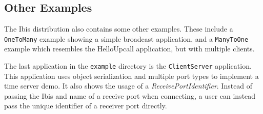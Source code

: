 \subsection{Other Examples}

The Ibis distribution also contains some other examples. These include
a \texttt{OneToMany} example showing a simple broadcast application, and a
\texttt{ManyToOne} example which resembles the HelloUpcall application,
but with multiple clients.

The last application in the \texttt{example} directory is
the \texttt{ClientServer} application. This application uses object
serialization and multiple port types to implement a time server demo.
It also shows the usage of a \emph{ReceivePortIdentifier}. Instead of
passing the Ibis and name of a receive port when connecting, a user can
instead pass the unique identifier of a receiver port directly.
